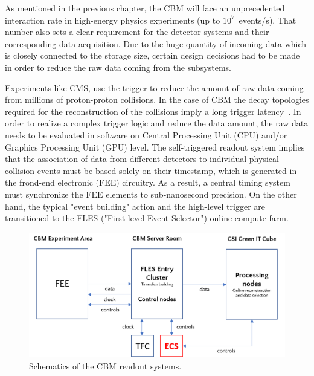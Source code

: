 
As mentioned in the previous chapter, the \gls{CBM} will face an unprecedented interaction rate in high-energy physics experiments (up to $10^{7}$~events/s). That number also sets a clear requirement for the detector systems and their corresponding data acquisition. Due to the huge quantity of incoming data which is closely connected to the storage size, certain design decisions had to be made in order to reduce the raw data coming from the subsystems. 

Experiments like \gls{CMS}, use the trigger to \cite{CMS-DAQ} reduce the amount of raw data coming from millions of proton-proton collisions.  In the case of \gls{CBM} the decay topologies required for the reconstruction of the collisions imply a long trigger latency~\cite{Friese_2017}.  In order to realize a complex trigger logic and reduce the data amount, the raw data needs to be evaluated in software on Central Processing Unit (\gls{CPU}) and/or Graphics Processing Unit (\gls{GPU}) level. The self-triggered readout system implies that the association of data from different detectors to individual physical collision events must be based solely on their timestamp, which is generated in the frond-end electronic (\gls{FEE}) circuitry. As a result, a central timing system must synchronize the \gls{FEE} elements to sub-nanosecond precision. On the other hand, the typical "event building" action and the high-level trigger are transitioned to the \gls{FLES} ("First-level Event Selector") online compute farm. 


\begin{figure}[!h]
\centering
\includegraphics[width=0.7\columnwidth]{Chapter3/Controls/images/online.png}
\caption{Schematics of the CBM readout systems.}
\label{fig_controls}
\end{figure}

